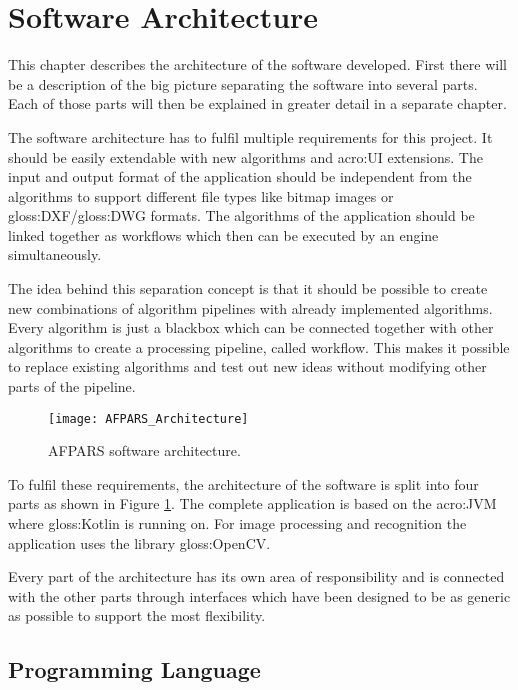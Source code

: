 \section{Software Architecture}
This chapter describes the architecture of the software developed. First there will be a description of the big picture separating the software into several parts. Each of those parts will then be explained in greater detail in a separate chapter.

The software architecture has to fulfil multiple requirements for this project. It should be easily extendable with new algorithms and \acrshort{acro:UI} extensions. The input and output format of the application should be independent from the algorithms to support different file types like bitmap images or \gls{gloss:DXF}/\gls{gloss:DWG} formats. The algorithms of the application should be linked together as workflows which then can be executed by an engine simultaneously.

The idea behind this separation concept is that it should be possible to create new combinations of algorithm pipelines with already implemented algorithms. Every algorithm is just a blackbox which can be connected together with other algorithms to create a processing pipeline, called workflow. This makes it possible to replace existing algorithms and test out new ideas without modifying other parts of the pipeline. 

\begin{figure}[h]
  \centering
      \texttt{[image: AFPARS\_Architecture]}
  \caption{AFPARS software architecture.}
  \label{fig:AFPARS_Architecture}
\end{figure}


To fulfil these requirements, the architecture of the software is split into four parts as shown in Figure \ref{fig:AFPARS_Architecture}. The complete application is based on the \acrfull{acro:JVM} where \gls{gloss:Kotlin} is running on. For image processing and recognition the application uses the library \gls{gloss:OpenCV}.

Every part of the architecture has its own area of responsibility and is connected with the other parts through interfaces which have been designed to be as generic as possible to support the most flexibility.

\subsection{Programming Language}

